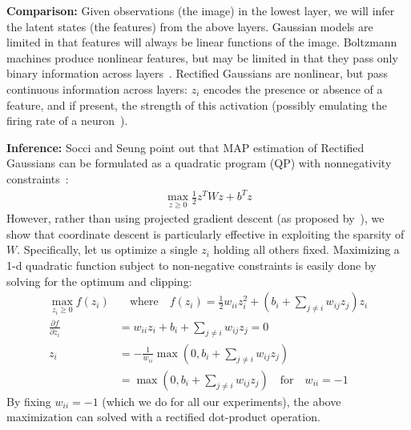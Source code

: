 \documentclass[10pt,twocolumn,letterpaper]{article}
\begin{document}
{\bf Comparison:} Given observations (the image) in the lowest layer,
we will infer the latent states (the features) from the above
layers. Gaussian models are limited in that features will always be
linear functions of the image. Boltzmann machines produce nonlinear
features, but may be limited in that they pass only binary information
across layers~\cite{nair2010rectified}. Rectified Gaussians are
nonlinear, but pass continuous information across layers: $z_i$
encodes the presence or absence of a feature, and if present, the
strength of this activation (possibly emulating the firing rate of a
neuron~\cite{kandel2000principles}).

{\bf Inference:} Socci and Seung point out that MAP estimation of
Rectified Gaussians can be formulated as a quadratic program (QP) with
nonnegativity constraints~\cite{socci1998rectified}:
\begin{align}
  \max_{z \geq 0} \frac{1}{2}z^TWz + b^Tz \label{eq:qp}
\end{align}
However, rather than using projected gradient descent (as proposed
by~\cite{socci1998rectified}), we show that coordinate descent is
particularly effective in exploiting the sparsity of
$W$. Specifically, let us optimize a single $z_i$ holding all others
fixed. Maximizing a 1-d quadratic function subject to non-negative
constraints is easily done by solving for the optimum and clipping:
\begin{align}
  \max_{z_i \geq 0} f(z_i) &\quad \text{where} \quad f(z_i) = \frac{1}{2} w_{ii} z_i^2 + (b_i + \sum_{j \neq i} w_{ij}z_j)z_i \nonumber\\
  \frac{\partial f}{\partial z_i}  &=  w_{ii}z_i + b_i + \sum_{j \neq i} w_{ij}z_j = 0 \nonumber\\
  z_i &= -\frac{1}{w_{ii}}\max(0,b_i + \sum_{j \neq i} w_{ij} z_j) \label{eq:coor}\\
  &= \max(0,b_i + \sum_{j \neq i} w_{ij} z_j)  \quad \text{for} \quad  w_{ii} = -1 \nonumber
\end{align}
By fixing $w_{ii} = -1$ (which we do for all our experiments), the above maximization can solved with a rectified dot-product operation.
\end{document}
